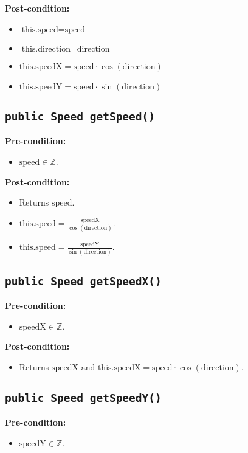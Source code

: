 \documentclass{article}
\begin{document}
\textbf{Post-condition:}
\begin{itemize}
    \item \( \text{this.speed} = \text{speed} \)
    \item \( \text{this.direction} = \text{direction} \)
    \item \( \text{this.speedX} = \text{speed} \cdot \cos(\text{direction}) \)
    \item \( \text{this.speedY} = \text{speed} \cdot \sin(\text{direction}) \)
\end{itemize}


\subsection*{\texttt{public Speed getSpeed()}}
\textbf{Pre-condition:}
\begin{itemize}
    \item \( \text{speed} \in \mathbb{Z} \).
\end{itemize}

\textbf{Post-condition:}
\begin{itemize}
    \item Returns \( \text{speed} \).
    \item \( \text{this.speed} = \frac{\text{speedX}}{\cos(\text{direction})} \).
    \item \( \text{this.speed} = \frac{\text{speedY}}{\sin(\text{direction})} \).
\end{itemize}


\subsection*{\texttt{public Speed getSpeedX()}}
\textbf{Pre-condition:}
\begin{itemize}
    \item \( \text{speedX} \in \mathbb{Z} \).
\end{itemize}

\textbf{Post-condition:}
\begin{itemize}
    \item Returns \( \text{speedX} \text{ and this.speedX} = \text{speed} \cdot \cos(\text{direction}) \).
\end{itemize}


\subsection*{\texttt{public Speed getSpeedY()}}
\textbf{Pre-condition:}
\begin{itemize}
    \item \( \text{speedY} \in \mathbb{Z} \).
\end{itemize}
\end{document}
